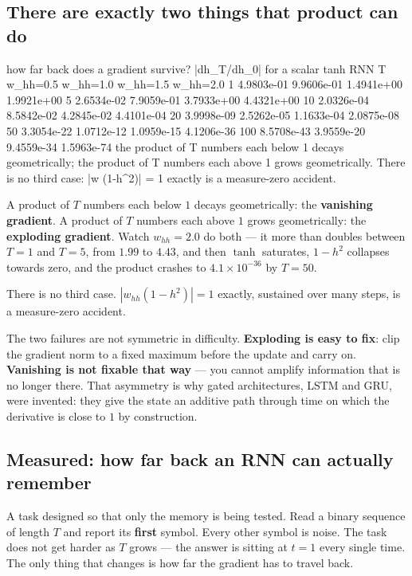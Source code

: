 \documentclass[11pt]{article}
\begin{document}
\subsection{There are exactly two things that product can do}

\begin{codeout}
how far back does a gradient survive?  |dh_T/dh_0| for a scalar tanh RNN
    T     w_hh=0.5      w_hh=1.0      w_hh=1.5      w_hh=2.0
     1   4.9803e-01   9.9606e-01   1.4941e+00   1.9921e+00
     5   2.6534e-02   7.9059e-01   3.7933e+00   4.4321e+00
    10   2.0326e-04   8.5842e-02   4.2845e-02   4.4101e-04
    20   3.9998e-09   2.5262e-05   1.1633e-04   2.0875e-08
    50   3.3054e-22   1.0712e-12   1.0959e-15   4.1206e-36
   100   8.5708e-43   3.9559e-20   9.4559e-34   1.5963e-74
the product of T numbers each below 1 decays geometrically;
the product of T numbers each above 1 grows geometrically. There is no
third case: |w (1-h^2)| = 1 exactly is a measure-zero accident.
\end{codeout}

A product of $T$ numbers each below $1$ decays geometrically: the
\textbf{vanishing gradient}. A product of $T$ numbers each above $1$ grows
geometrically: the \textbf{exploding gradient}. Watch $w_{hh} = 2.0$ do both
--- it more than doubles between $T = 1$ and $T = 5$, from $1.99$ to $4.43$,
and then $\tanh$ saturates, $1 - h^2$ collapses towards zero, and the product
crashes to $4.1\times10^{-36}$ by $T = 50$.

There is no third case. $|w_{hh}(1-h^2)| = 1$ exactly, sustained over many
steps, is a measure-zero accident.

\begin{caution}
The two failures are not symmetric in difficulty. \textbf{Exploding is easy to
fix}: clip the gradient norm to a fixed maximum before the update and carry
on. \textbf{Vanishing is not fixable that way} --- you cannot amplify
information that is no longer there. That asymmetry is why gated
architectures, LSTM and GRU, were invented: they give the state an additive
path through time on which the derivative is close to $1$ by construction.
\end{caution}

\subsection{Measured: how far back an RNN can actually remember}

A task designed so that only the memory is being tested. Read a binary
sequence of length $T$ and report its \textbf{first} symbol. Every other
symbol is noise. The task does not get harder as $T$ grows --- the answer is
sitting at $t = 1$ every single time. The only thing that changes is how far
the gradient has to travel back.
\end{document}
